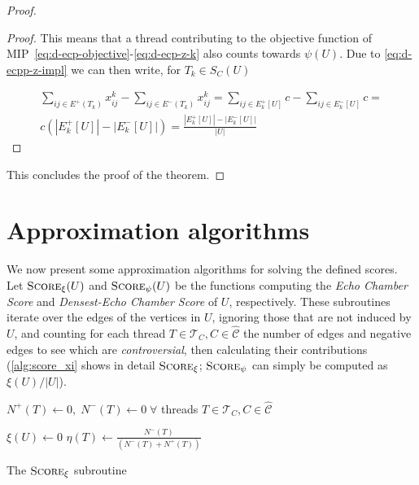 \begin{proof}
\begin{proof}
		This means that a thread contributing to the objective function of
		MIP~\ref{eq:d-ecp-objective}-\ref{eq:d-ecp-z-k} also counts towards
		$\psi(U)$. Due to \autoref{eq:d-ecpp-z-impl} we can then write, for
		$T_k \in S_C(U)$

		\begin{multline*}
			\sum^{}_{ij \in E^{+} (T_{k})} x_{ij} ^{k} - \sum_{ij \in E^{-}
				(T_{k})} x_{ij} ^{k} = \sum^{}_{ij \in E^{+}_k[U] } c - \sum_{ij \in E^{-}
			_k[U]} c = \\ c (|E^{+}_{k}[U]| - |E^{-}_{k}[U]|) =
			\frac{|E^{+}_{k}[U]| - |E^{-}_{k}[U]|}{|U|}
		\end{multline*}
	\end{proof}

	This concludes the proof of the theorem.

\end{proof}

\section{Approximation algorithms}%
\label{sub:approximation_algorithms}

We now present some approximation algorithms for solving the defined scores.
Let $\textsc{Score}_{\xi} (U)$ and $\textsc{Score}_{\psi} (U)$ be the functions computing the
\emph{Echo Chamber Score} and \emph{Densest-Echo Chamber Score} of $U$,
respectively. These subroutines iterate over the edges of the vertices in $U$,
ignoring those that are not induced by $U$, and counting for each thread $T \in
	\mathcal{T}_{C}, C \in \mathcal{\hat{C}} $ the number of edges and negative edges
to see which are \emph{controversial}, then calculating their contributions
(\autoref{alg:score_xi} shows in detail $\textsc{Score}_\xi$;
$\textsc{Score}_\psi$ can simply be computed as $\xi(U)/|U|$).

\begin{algorithm}
	\SetAlgoLined
	$N^{+} (T) \leftarrow 0, \; N^{-} (T) \leftarrow 0\; \forall $ threads $T
		\in \mathcal{T}_{C}, C \in \mathcal{\hat{C}}   $ \;


	$\xi(U) \leftarrow 0$ \;
	$\eta(T) \leftarrow\frac{N^{-}(T)}{(N^{-}(T) + N^{+} (T))}$ \;

	\caption{The $\textsc{Score}_{\xi}  $ subroutine}
	\label{alg:score_xi}
\end{algorithm}

